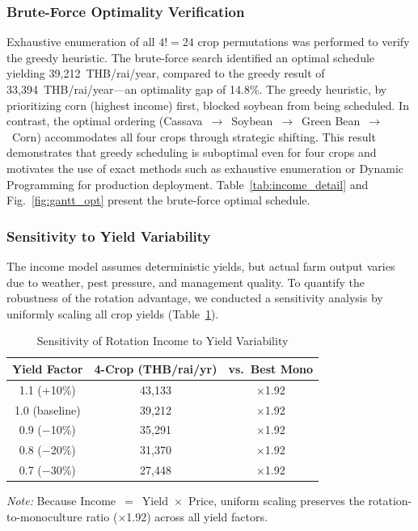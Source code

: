 \documentclass[conference]{IEEEtran}
\begin{document}
\subsubsection{Brute-Force Optimality Verification}
\label{sec:bruteforce}

Exhaustive enumeration of all $4! = 24$ crop permutations was performed to verify the greedy heuristic. The brute-force search identified an optimal schedule yielding 39,212~THB/rai/year, compared to the greedy result of 33,394~THB/rai/year---an optimality gap of 14.8\%. The greedy heuristic, by prioritizing corn (highest income) first, blocked soybean from being scheduled. In contrast, the optimal ordering (Cassava~$\rightarrow$~Soybean~$\rightarrow$~Green Bean~$\rightarrow$~Corn) accommodates all four crops through strategic shifting. This result demonstrates that greedy scheduling is suboptimal even for four crops and motivates the use of exact methods such as exhaustive enumeration or Dynamic Programming for production deployment. Table~\ref{tab:income_detail} and Fig.~\ref{fig:gantt_opt} present the brute-force optimal schedule.

\subsubsection{Sensitivity to Yield Variability}
\label{sec:sensitivity}

The income model assumes deterministic yields, but actual farm output varies due to weather, pest pressure, and management quality. To quantify the robustness of the rotation advantage, we conducted a sensitivity analysis by uniformly scaling all crop yields (Table~\ref{tab:sensitivity}).

\begin{table}[htbp]
  \centering
  \caption{Sensitivity of Rotation Income to Yield Variability}
  \label{tab:sensitivity}
  \begin{tabular}{ccc}
    \toprule
    \textbf{Yield Factor} & \textbf{4-Crop (THB/rai/yr)} & \textbf{vs.\ Best Mono} \\
    \midrule
    1.1 ($+$10\%) & 43,133 & $\times$1.92 \\
    1.0 (baseline) & 39,212 & $\times$1.92 \\
    0.9 ($-$10\%)  & 35,291 & $\times$1.92 \\
    0.8 ($-$20\%)  & 31,370 & $\times$1.92 \\
    0.7 ($-$30\%)  & 27,448 & $\times$1.92 \\
    \bottomrule
  \end{tabular}
  \vspace{2pt}
  \raggedright\scriptsize\textit{Note:} Because Income~$=$~Yield~$\times$~Price, uniform scaling preserves the rotation-to-monoculture ratio ($\times$1.92) across all yield factors.
\end{table}
\end{document}
